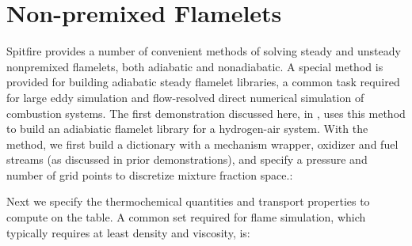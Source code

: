 \documentclass[letterpaper,10pt,english]{sphinxmanual}
\begin{document}
\section{Non-premixed Flamelets}
\label{\detokenize{combustion:non-premixed-flamelets}}
Spitfire provides a number of convenient methods of solving steady and unsteady nonpremixed flamelets, both adiabatic and nonadiabatic.
A special method is provided for building adiabatic steady flamelet libraries, a common task required for large eddy simulation and flow-resolved direct numerical simulation of combustion systems.
The first demonstration discussed here, in , uses this method to build an adiabiatic flamelet library for a hydrogen-air system.
With the  method, we first build a dictionary with a mechanism wrapper, oxidizer and fuel streams (as discussed in prior demonstrations), and specify a pressure and number of grid points to discretize mixture fraction space.:

\begin{sphinxVerbatim}[commandchars=\\\{\}]
   
                   
                   
                   
                   
\end{sphinxVerbatim}

Next we specify the thermochemical quantities and transport properties to compute on the table.
A common set required for flame simulation, which typically requires at least density and viscosity, is:

\begin{sphinxVerbatim}[commandchars=\\\{\}]
  \PYG{p}{[}   \PYG{p}{]}
\end{sphinxVerbatim}
\end{document}
